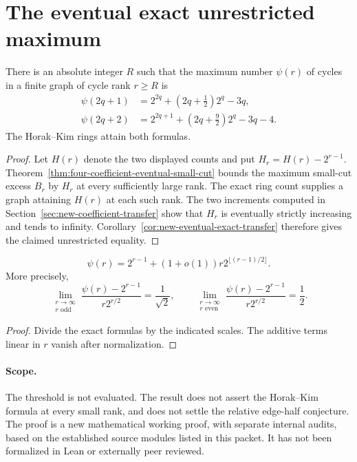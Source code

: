 \section{The eventual exact unrestricted maximum}
\label{sec:eventual-exact-cycle-theorem}

\begin{theorem}
\label{thm:eventual-exact-cycle-maximum}
There is an absolute integer $R$ such that the maximum number $\psi(r)$ of cycles in a finite graph of cycle rank $r\ge R$ is
\[
\begin{aligned}
 \psi(2q+1)&=2^{2q}+(2q+\tfrac12)2^q-3q,\\
 \psi(2q+2)&=2^{2q+1}+(2q+\tfrac92)2^q-3q-4.
\end{aligned}
\]
The Horak--Kim rings attain both formulas.
\end{theorem}

\begin{proof}
Let $H(r)$ denote the two displayed counts and put $H_r=H(r)-2^{r-1}$.
Theorem~\ref{thm:four-coefficient-eventual-small-cut} bounds the maximum small-cut excess $B_r$ by $H_r$ at every sufficiently large rank.
The exact ring count supplies a graph attaining $H(r)$ at each such rank.
The two increments computed in Section~\ref{sec:new-coefficient-transfer} show that $H_r$ is eventually strictly increasing and tends to infinity.
Corollary~\ref{cor:new-eventual-exact-transfer} therefore gives the claimed unrestricted equality.
\end{proof}

\begin{corollary}
\[
 \psi(r)=2^{r-1}+(1+o(1))r2^{\lfloor(r-1)/2\rfloor}.
\]
More precisely,
\[
 \lim_{\substack{r\to\infty\\r\text{ odd}}}
 \frac{\psi(r)-2^{r-1}}{r2^{r/2}}=\frac1{\sqrt2},
 \qquad
 \lim_{\substack{r\to\infty\\r\text{ even}}}
 \frac{\psi(r)-2^{r-1}}{r2^{r/2}}=\frac12.
\]
\end{corollary}

\begin{proof}
Divide the exact formulas by the indicated scales.
The additive terms linear in $r$ vanish after normalization.
\end{proof}

\paragraph{Scope.}
The threshold is not evaluated.
The result does not assert the Horak--Kim formula at every small rank, and does not settle the relative edge-half conjecture.
The proof is a new mathematical working proof, with separate internal audits, based on the established source modules listed in this packet.
It has not been formalized in Lean or externally peer reviewed.
